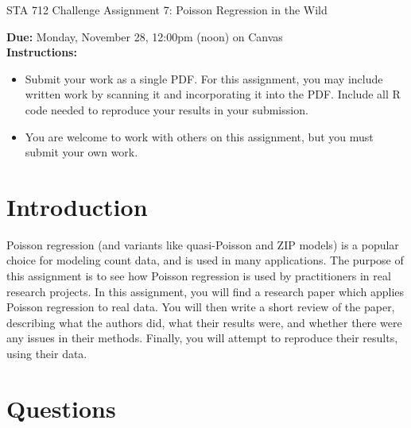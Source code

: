 \documentclass[11pt]{article}
\begin{document}
\begin{center}
\Large
STA 712 Challenge Assignment 7: Poisson Regression in the Wild\\
\normalsize
\vspace{5mm}
\end{center}

\noindent \textbf{Due:} Monday, November 28, 12:00pm (noon) on Canvas\\ 

\noindent \textbf{Instructions:} 
\begin{itemize}
\item Submit your work as a single PDF. For this assignment, you may include written work by scanning it and incorporating it into the PDF. Include all R code needed to reproduce your results in your submission.
\item You are welcome to work with others on this assignment, but you must submit your own work.
\end{itemize}

\section*{Introduction}

Poisson regression (and variants like quasi-Poisson and ZIP models) is a popular choice for modeling count data, and is used in many applications. The purpose of this assignment is to see how Poisson regression is used by practitioners in real research projects. In this assignment, you will find a research paper which applies Poisson regression to real data. You will then write a short review of the paper, describing what the authors did, what their results were, and whether there were any issues in their methods. Finally, you will attempt to reproduce their results, using their data.

\section*{Questions}
\end{document}
